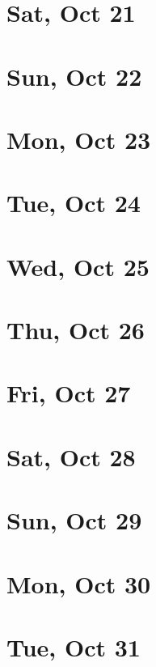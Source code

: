 	\section{Sat, Oct 21}
		
	\section{Sun, Oct 22}
		
	\section{Mon, Oct 23}
		
	\section{Tue, Oct 24}
		
	\section{Wed, Oct 25}
		
	\section{Thu, Oct 26}
		
	\section{Fri, Oct 27}
		
	\section{Sat, Oct 28}
		
	\section{Sun, Oct 29}
		
	\section{Mon, Oct 30}
		
	\section{Tue, Oct 31}
		
